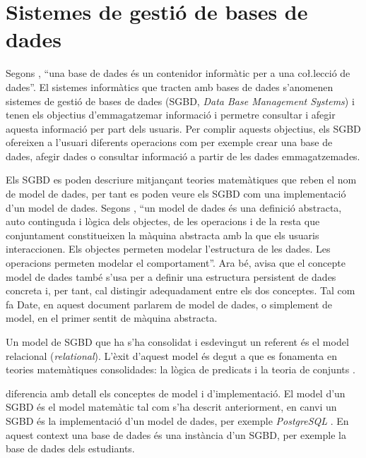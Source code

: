 \section{Sistemes de gestió de bases de dades}
\label{sec:art:sgbd}


Segons \textcite{date:introduction}, ``una base de dades és un
contenidor informàtic per a una co\l.lecció de dades''. El sistemes
informàtics que tracten amb bases de dades s'anomenen sistemes de
gestió de bases de dades (SGBD, \emph{Data Base Management Systems}) i
tenen els objectius d'emmagatzemar informació i permetre consultar i
afegir aquesta informació per part dels usuaris.  Per complir aquests
objectius, els SGBD ofereixen a l'usuari diferents operacions com per
exemple crear una base de dades, afegir dades o consultar informació a
partir de les dades emmagatzemades.

Els SGBD es poden descriure mitjançant teories matemàtiques que reben
el nom de model de dades, per tant es poden veure els SGBD com una
implementació d'un model de dades.  Segons
\citeauthor{date:introduction}, ``un model de dades és una definició
abstracta, auto continguda i lògica dels objectes, de les operacions i
de la resta que conjuntament constitueixen la màquina abstracta amb la
que els usuaris interaccionen. Els objectes permeten modelar
l'estructura de les dades. Les operacions permeten modelar el
comportament''. Ara bé, \citeauthor{date:introduction} avisa que el
concepte model de dades també s'usa per a definir una estructura
persistent de dades concreta i, per tant, cal distingir adequadament
entre els dos conceptes.  Tal com fa Date, en aquest document parlarem
de model de dades, o simplement de model, en el primer sentit de
màquina abstracta.


Un model de SGBD que ha s'ha consolidat i esdevingut un referent és el
model relacional (\emph{relational}). L'èxit d'aquest model és degut a
que es fonamenta en teories matemàtiques consolidades: la lògica de
predicats i la teoria de conjunts \parencite{date:introduction}.



\textcite{date:introduction} diferencia amb detall els conceptes de
model i d'implementació.  El model d'un SGBD és el model matemàtic tal
com s'ha descrit anteriorment, en canvi un SGBD és la implementació
d'un model de dades, per exemple \emph{PostgreSQL} \parencite{postgresql}.
En aquest context una base de dades és una instància d'un SGBD,
per exemple la base de dades dels estudiants.


